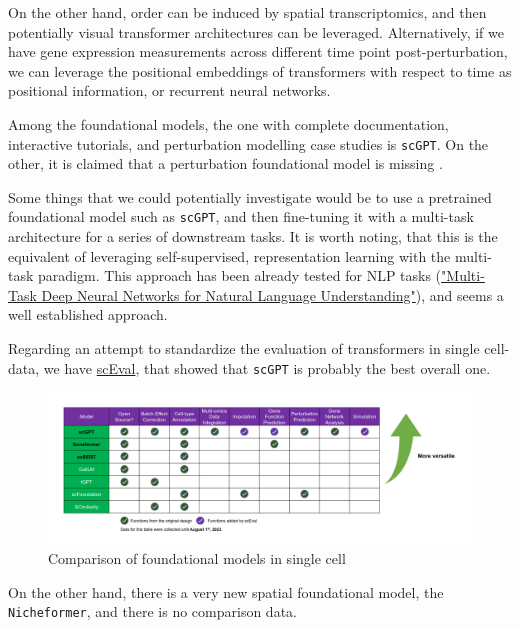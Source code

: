 \documentclass[12pt, a4paper]{article}
\begin{document}
On the other hand, order can be induced by spatial transcriptomics, and then potentially visual transformer architectures can be leveraged. Alternatively, if we have gene expression measurements across different time point post-perturbation, we can leverage the positional embeddings of transformers with respect to time as positional information, or recurrent neural networks.

Among the foundational models, the one with complete documentation, interactive tutorials, and perturbation modelling case studies is \verb|scGPT|. On the other, it is claimed that a perturbation foundational model is missing \cite{szalataTransformersSinglecellOmics2024}.

Some things that we could potentially investigate would be to use a pretrained foundational model such as \verb|scGPT|, and then fine-tuning it with a multi-task architecture for a series of downstream tasks. It is worth noting, that this is the equivalent of leveraging self-supervised, representation learning with the multi-task paradigm. This approach has been already tested for NLP tasks (\href{https://arxiv.org/pdf/1901.11504}{"Multi-Task Deep Neural Networks for Natural Language Understanding"}), and seems a well established approach.

Regarding an attempt to standardize the evaluation of transformers in single cell-data, we have \href{https://github.com/HelloWorldLTY/scEval}{scEval}\cite{zhaoEvaluatingUtilitiesLarge2023}, that showed that \verb|scGPT| is probably the best overall one.

\begin{figure}[h!]
  \centering
  \includegraphics[width=\textwidth]{sceval.png}
  \caption{Comparison of foundational models in single cell \cite{zhaoEvaluatingUtilitiesLarge2023}}
\end{figure}

On the other hand, there is a very new spatial foundational model, the \verb|Nicheformer|, and there is no comparison data.

\clearpage
\end{document}
